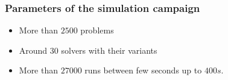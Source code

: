 \begin{frame}
  \frametitle{Parameters of the simulation campaign}

  \begin{itemize}
  \item More than $2500$ problems
  \item Around $30$ solvers with their variants
  \item More than $27000$ runs between few seconds up to $400s$.
  \end{itemize}
\end{frame}



